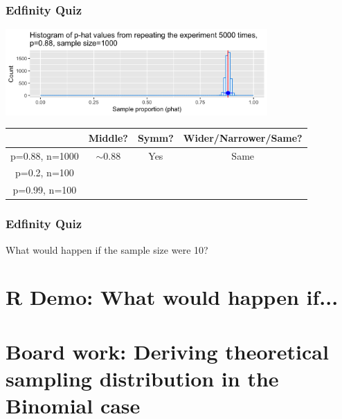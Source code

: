 \documentclass[t,compress,mathserif]{beamer}
\begin{document}
\begin{frame}
    \frametitle{Edfinity Quiz}
    \begin{center}
        \includegraphics[width=0.75\textwidth]{sampling_distribution.png}
    \end{center}
    
    \begin{table}[h!]
        \centering
        \begin{tabular}{|c|c|c|c|}
        \hline
         & Middle? & Symm? & Wider/Narrower/Same? \\ 
        \hline
        p=0.88, n=1000 & $\sim0.88$ & Yes & Same \\ 
        \hline
        p=0.2, n=100 &  &  &  \\ 
        \hline
        p=0.99, n=100 &  &  &  \\ 
        \hline
        \end{tabular}
    \end{table}
\end{frame}

\begin{frame}
    \frametitle{Edfinity Quiz}
    What would happen if the sample size were 10?
\end{frame}


\section{R Demo: What would happen if...}


\section{Board work: Deriving theoretical sampling distribution in the Binomial case}

\end{document}
